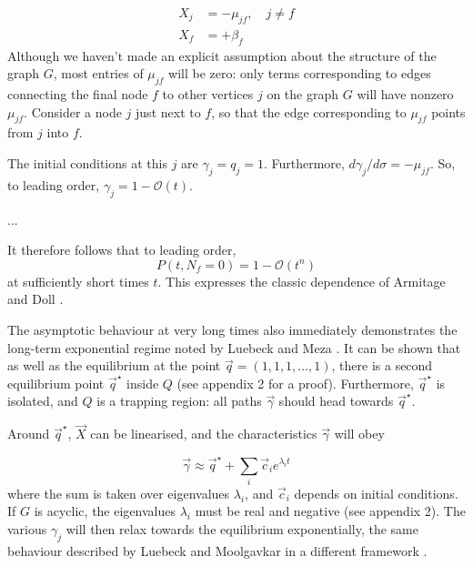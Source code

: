 \documentclass{article}
\begin{document}
\begin{align}
    X_j &= - \mu_{jf}, \quad j \neq f
    \nonumber \\
    X_f &= + \beta_f
\end{align}
Although we haven't made an explicit assumption about the structure of the graph
$G$, most entries of $\mu_{jf}$ will be zero: only terms corresponding to edges
connecting the final node $f$ to other vertices $j$ on the graph $G$ will have
nonzero $\mu_{jf}$. Consider a node $j$ just next to $f$, so that the edge
corresponding to $\mu_{jf}$ points from $j$ into $f$.

The initial conditions at this $j$ are $\gamma_j = q_j = 1$. Furthermore, $d
\gamma_j / d\sigma = -\mu_{jf}$. So, to leading order, $\gamma_j = 1 -
\mathcal{O}(t)$.


...

It therefore follows that to leading order, 
\begin{equation}
    P(t, N_f = 0) = 1 - \mathcal{O}(t^n)
\end{equation}
at sufficiently short times $t$. This expresses the classic dependence of
Armitage and Doll \cite{armitage_doll}.

The asymptotic behaviour at very long times also immediately demonstrates the
long-term exponential regime noted by Luebeck and Meza \cite{meza2008age}.
It can be shown that as well as the equilibrium at the point $\vec{q} =
(1,1,1,\dots,1)$, there is a second equilibrium point $\vec{q}^\star$ inside $Q$ (see appendix 2
for a proof). Furthermore, $\vec{q}^\star$ is isolated, and $Q$ is a trapping region:
all paths $\vec{\gamma}$ should head towards $\vec{q}^\star$.

Around $\vec{q}^\star$, $\vec{X}$ can be linearised, and the characteristics
$\vec{\gamma}$ will obey

\begin{equation}
    \vec{\gamma} \approx \vec{q}^\star + \sum_i \vec{c}_i e^{\lambda_i t}
\end{equation}
where the sum is taken over eigenvalues $\lambda_i$, and $\vec{c}_i$ depends on
initial conditions. If $G$ is acyclic, the eigenvalues $\lambda_i$ must be real
and negative (see appendix 2). The various $\gamma_j$ will then relax towards
the equilibrium exponentially, the same behaviour described by Luebeck and
Moolgavkar in a different framework \cite{meza2008age}.
\end{document}
